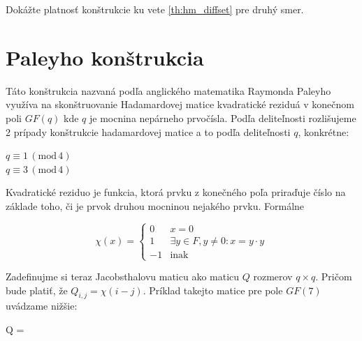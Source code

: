 \begin{exercise}
\label{ex:hm_diffset}
Dokážte platnosť konštrukcie ku vete \ref{th:hm_diffset} pre druhý smer. 
\end{exercise}


\section{Paleyho konštrukcia}

Táto konštrukcia nazvaná podľa anglického matematika Raymonda Paleyho využíva na skonštruovanie Hadamardovej matice kvadratické reziduá v konečnom poli $GF(q)$ kde $q$ je mocnina nepárneho prvočísla. Podľa deliteľnosti rozlišujeme 2 prípady konštrukcie hadamardovej matice a to podľa deliteľnosti $q$, konkrétne:
\begin{center}
$q \equiv 1\,(\text{mod}\,4)$ \\
$q \equiv 3\,(\text{mod}\,4)$
\end{center}

Kvadratické reziduo je funkcia, ktorá prvku z konečného poľa priraďuje číslo na základe toho, či je prvok druhou mocninou nejakého prvku. Formálne

\begin{center}
\begin{equation*}
    \chi(x) = \begin{cases}
               0               & x = 0\\
               1               & \exists y \in F, y \neq 0: x = y \cdot y\\
               -1              & \text{inak}
           \end{cases}
\end{equation*}
\end{center}

Zadefinujme si teraz Jacobsthalovu maticu ako maticu $Q$ rozmerov $q\times q$. Pričom bude platiť, že $Q_{i,j} = \chi(i-j)$. Príklad takejto matice pre pole $GF(7)$ uvádzame nižšie:

\begin{center}
Q = 
\end{center}

